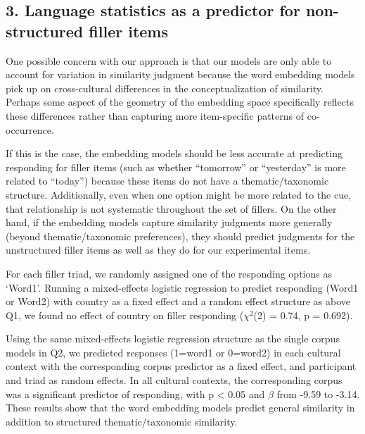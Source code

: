 \documentclass[10pt, letterpaper]{article}
\begin{document}
\hypertarget{language-statistics-as-a-predictor-for-non-structured-filler-items}{%
\subsection{3. Language statistics as a predictor for non-structured
filler
items}\label{language-statistics-as-a-predictor-for-non-structured-filler-items}}

One possible concern with our approach is that our models are only able
to account for variation in similarity judgment because the word
embedding models pick up on cross-cultural differences in the
conceptualization of similarity. Perhaps some aspect of the geometry of
the embedding space specifically reflects these differences rather than
capturing more item-specific patterns of co-occurrence.

If this is the case, the embedding models should be less accurate at
predicting responding for filler items (such as whether ``tomorrow'' or
``yesterday'' is more related to ``today'') because these items do not
have a thematic/taxonomic structure. Additionally, even when one option
might be more related to the cue, that relationship is not systematic
throughout the set of fillers. On the other hand, if the embedding
models capture similarity judgments more generally (beyond
thematic/taxonomic preferences), they should predict judgments for the
unstructured filler items as well as they do for our experimental items.

For each filler triad, we randomly assigned one of the responding
options as `Word1'. Running a mixed-effects logistic regression to
predict responding (Word1 or Word2) with country as a fixed effect and a
random effect structure as above Q1, we found no effect of country on
filler responding (\(\chi^2\)(2) = 0.74, p = 0.692).

Using the same mixed-effects logistic regression structure as the single
corpus models in Q2, we predicted responses (1=word1 or 0=word2) in each
cultural context with the corresponding corpus predictor as a fixed
effect, and participant and triad as random effects. In all cultural
contexts, the corresponding corpus was a significant predictor of
responding, with p \textless{} 0.05 and \(\beta\) from -9.59 to -3.14.
These results show that the word embedding models predict general
similarity in addition to structured thematic/taxonomic similarity.
\end{document}
